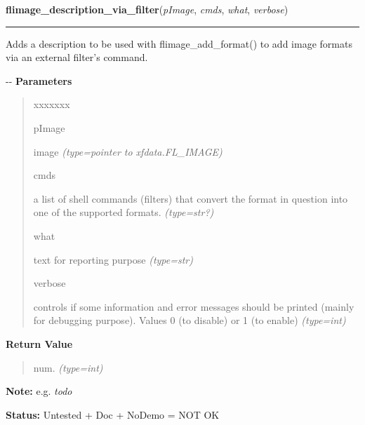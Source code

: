 \hspace{.8\funcindent}\begin{boxedminipage}{\funcwidth}

    \raggedright \textbf{flimage\_description\_via\_filter}(\textit{pImage}, \textit{cmds}, \textit{what}, \textit{verbose})

    \vspace{-1.5ex}

    \rule{\textwidth}{0.5\fboxrule}
\setlength{\parskip}{2ex}

Adds a description to be used with flimage\_add\_format() to add image
formats via an external filter's command.

-{}-
\setlength{\parskip}{1ex}
      \textbf{Parameters}
      \vspace{-1ex}

      \begin{quote}
        \begin{Ventry}{xxxxxxx}

          \item[pImage]


image
            {\it (type=pointer to xfdata.FL\_IMAGE)}

          \item[cmds]


a list of shell commands (filters) that convert the format in
question into one of the supported formats.
            {\it (type=str?)}

          \item[what]


text for reporting purpose
            {\it (type=str)}

          \item[verbose]


controls if some information and error messages should be printed
(mainly for debugging purpose). Values 0 (to disable) or 1 (to enable)
            {\it (type=int)}

        \end{Ventry}

      \end{quote}

      \textbf{Return Value}
    \vspace{-1ex}

      \begin{quote}

num.
      {\it (type=int)}

      \end{quote}

\textbf{Note:} 
e.g. \emph{todo}


\textbf{Status:} 
Untested + Doc + NoDemo = NOT OK


    \end{boxedminipage}

